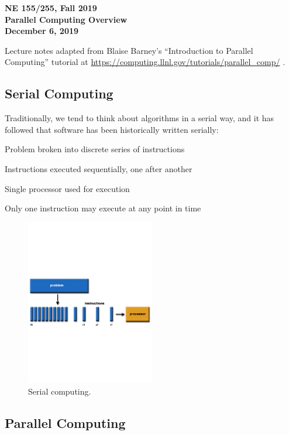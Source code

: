 \documentclass[12pt]{article}
\begin{document}
\begin{center}
{\bf NE 155/255, Fall 2019 \\
Parallel Computing Overview \\
December 6, 2019 
}
\end{center}

Lecture notes adapted from Blaise Barney's ``Introduction to Parallel
Computing'' tutorial at
\url{https://computing.llnl.gov/tutorials/parallel_comp/} .

\subsection*{Serial Computing}

Traditionally, we tend to think about algorithms in a serial way, and it has
followed that software has been historically written serially:

\begin{compactitem}
\item Problem broken into discrete series of instructions
\item Instructions executed sequentially, one after another
\item Single processor used for execution
\item Only one instruction may execute at any point in time
\end{compactitem}

\begin{figure}[hbt!]
\centering
\includegraphics[width=0.5\textwidth]{serial-problem.pdf}
\caption{Serial computing.}
\end{figure}

\FloatBarrier
\subsection*{Parallel Computing}
\end{document}
